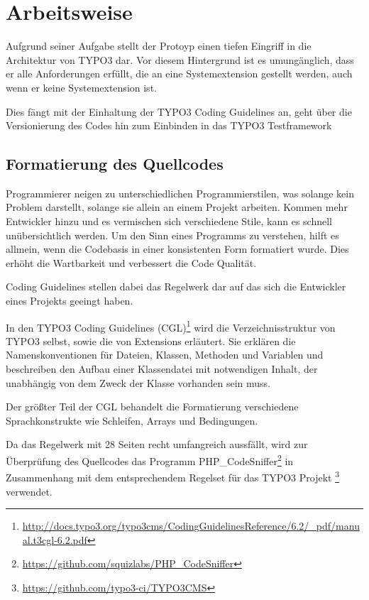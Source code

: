 \section{Arbeitsweise}
\label{sec:workstyle}
Aufgrund seiner Aufgabe stellt der Protoyp einen tiefen Eingriff in die Architektur von TYPO3 dar. Vor diesem Hintergrund ist es umungänglich, dass er alle Anforderungen erfüllt, die an eine Systemextension gestellt werden, auch wenn er keine Systemextension ist.

Dies fängt mit der Einhaltung der TYPO3 Coding Guidelines an, geht über die Versionierung des Codes hin zum Einbinden in das TYPO3 Testframework

\subsection{Formatierung des Quellcodes}
Programmierer neigen zu unterschiedlichen Programmierstilen, was solange kein Problem darstellt, solange sie allein an einem Projekt arbeiten. Kommen mehr Entwickler hinzu und es vermischen sich verschiedene Stile, kann es schnell unübersichtlich werden. Um den Sinn eines Programms zu verstehen, hilft es allmein, wenn die Codebasis in einer konsistenten Form formatiert wurde. Dies erhöht die Wartbarkeit und verbessert die Code Qualität.

Coding Guidelines stellen dabei das Regelwerk dar auf das sich die Entwickler eines Projekts geeingt haben.

In den TYPO3 Coding Guidelines (CGL)\footnote{\url{http://docs.typo3.org/typo3cms/CodingGuidelinesReference/6.2/_pdf/manual.t3cgl-6.2.pdf}} wird die Verzeichnisstruktur von TYPO3 selbst, sowie die von Extensions erläutert. Sie erklären die Namenskonventionen für Dateien, Klassen, Methoden und Variablen und beschreiben den Aufbau einer Klassendatei mit notwendigen Inhalt, der unabhängig von dem Zweck der Klasse vorhanden sein muss.

Der größter Teil der CGL behandelt die Formatierung verschiedene Sprachkonstrukte wie Schleifen, Arrays und Bedingungen.

Da das Regelwerk mit 28 Seiten recht umfangreich aussfällt, wird zur Überprüfung des Quellcodes das Programm PHP\_CodeSniffer\footnote{\url{https://github.com/squizlabs/PHP_CodeSniffer}} in Zusammenhang mit dem entsprechendem Regelset für das TYPO3 Projekt \footnote{\url{https://github.com/typo3-ci/TYPO3CMS}} verwendet.

